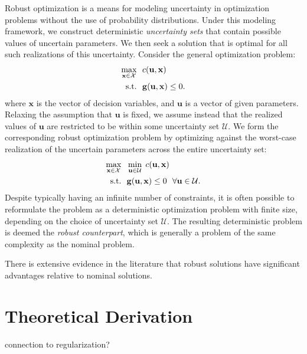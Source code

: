 \documentclass[twoside,12pt]{article}
\newcommand{\M}[1]{\boldsymbol{\mathbf{#1}}}
\newcommand{\V}{\M}
\newcommand{\Cal}{\mathcal}
\begin{document}
Robust optimization is a means for modeling uncertainty in optimization problems without the use of probability distributions.
Under this modeling framework, we construct deterministic \emph{uncertainty sets} that contain possible values of uncertain parameters. We then seek a solution that is optimal for all such realizations of this uncertainty. Consider the general optimization problem:
\[
\begin{aligned}
  \max_{\V x \in \Cal X} ~~ & c(\V u, \V x)\\
  \textup{s.t.} ~~ & \V g (\V u, \V x) \le 0.
\end{aligned}
\]
where $\V x$ is the vector of decision variables, and $\V u$ is a vector of given parameters. Relaxing the assumption that $\V u$ is fixed, we assume instead that the realized values of $\V u$ are restricted to be within some uncertainty set $\Cal U$. We form the corresponding robust optimization problem by optimizing against the worst-case realization of the uncertain parameters across the entire uncertainty set:
\[
\begin{aligned}
  \max_{\V x \in \Cal X} ~~ & \min_{\V u \in \Cal U} \; c(\V u, \V x) \\
  \textup{s.t.} ~~ & \V g (\V u, \V x) \le 0 ~~ \forall \V u \in \Cal U.
\end{aligned}
\]
Despite typically having an infinite number of constraints, it is often possible to reformulate the problem as a deterministic optimization problem with finite size, depending on the choice of uncertainty set $\Cal U$. The resulting deterministic problem is deemed the \emph{robust counterpart}, which is generally a problem of the same complexity as the nominal problem.

There is extensive evidence in the literature that robust solutions have significant advantages relative to nominal solutions.


\section{Theoretical Derivation}

connection to regularization?
\end{document}
